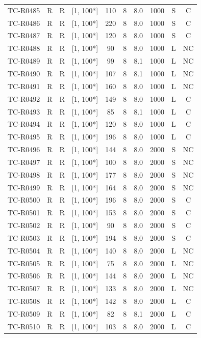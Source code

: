 \begin{longtable}{lccccccccc}
TC-R0485 & R & R & [1, 100*] & 110 & 8 & 8.0 & 1000 & S & C \\
TC-R0486 & R & R & [1, 100*] & 220 & 8 & 8.0 & 1000 & S & C \\
TC-R0487 & R & R & [1, 100*] & 120 & 8 & 8.0 & 1000 & S & C \\
TC-R0488 & R & R & [1, 100*] & 90 & 8 & 8.0 & 1000 & L & NC \\
TC-R0489 & R & R & [1, 100*] & 99 & 8 & 8.1 & 1000 & L & NC \\
TC-R0490 & R & R & [1, 100*] & 107 & 8 & 8.1 & 1000 & L & NC \\
TC-R0491 & R & R & [1, 100*] & 160 & 8 & 8.0 & 1000 & L & NC \\
TC-R0492 & R & R & [1, 100*] & 149 & 8 & 8.0 & 1000 & L & C \\
TC-R0493 & R & R & [1, 100*] & 85 & 8 & 8.1 & 1000 & L & C \\
TC-R0494 & R & R & [1, 100*] & 120 & 8 & 8.0 & 1000 & L & C \\
TC-R0495 & R & R & [1, 100*] & 196 & 8 & 8.0 & 1000 & L & C \\
TC-R0496 & R & R & [1, 100*] & 144 & 8 & 8.0 & 2000 & S & NC \\
TC-R0497 & R & R & [1, 100*] & 100 & 8 & 8.0 & 2000 & S & NC \\
TC-R0498 & R & R & [1, 100*] & 177 & 8 & 8.0 & 2000 & S & NC \\
TC-R0499 & R & R & [1, 100*] & 164 & 8 & 8.0 & 2000 & S & NC \\
TC-R0500 & R & R & [1, 100*] & 196 & 8 & 8.0 & 2000 & S & C \\
TC-R0501 & R & R & [1, 100*] & 153 & 8 & 8.0 & 2000 & S & C \\
TC-R0502 & R & R & [1, 100*] & 90 & 8 & 8.0 & 2000 & S & C \\
TC-R0503 & R & R & [1, 100*] & 194 & 8 & 8.0 & 2000 & S & C \\
TC-R0504 & R & R & [1, 100*] & 140 & 8 & 8.0 & 2000 & L & NC \\
TC-R0505 & R & R & [1, 100*] & 75 & 8 & 8.0 & 2000 & L & NC \\
TC-R0506 & R & R & [1, 100*] & 144 & 8 & 8.0 & 2000 & L & NC \\
TC-R0507 & R & R & [1, 100*] & 133 & 8 & 8.0 & 2000 & L & NC \\
TC-R0508 & R & R & [1, 100*] & 142 & 8 & 8.0 & 2000 & L & C \\
TC-R0509 & R & R & [1, 100*] & 82 & 8 & 8.1 & 2000 & L & C \\
TC-R0510 & R & R & [1, 100*] & 103 & 8 & 8.0 & 2000 & L & C \\

\end{longtable}
